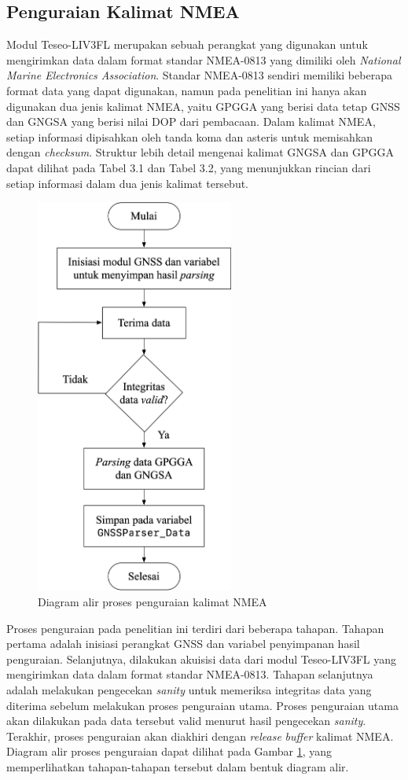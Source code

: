 \subsection{Penguraian Kalimat NMEA}
Modul Teseo\hyp{}LIV3FL merupakan sebuah perangkat yang digunakan untuk mengirimkan data dalam format standar NMEA-0813 yang dimiliki oleh \textit{National Marine Electronics Association}. Standar NMEA-0813 sendiri memiliki beberapa format data yang dapat digunakan, namun pada penelitian ini hanya akan digunakan dua jenis kalimat NMEA, yaitu GPGGA yang berisi data tetap GNSS dan GNGSA yang berisi nilai DOP dari pembacaan. Dalam kalimat NMEA, setiap informasi dipisahkan oleh tanda koma dan asteris untuk memisahkan dengan \textit{checksum}. Struktur lebih detail mengenai kalimat GNGSA dan GPGGA dapat dilihat pada Tabel 3.1 dan Tabel 3.2, yang menunjukkan rincian dari setiap informasi dalam dua jenis kalimat tersebut.

\begin{figure}[H]
	\centering
	\includegraphics[width=6.5cm]{contents/chapter-3/diagram-parser.png}
	\caption{Diagram alir proses penguraian kalimat NMEA}
	\label{Fig: flowchart-parsing}
\end{figure}

Proses penguraian pada penelitian ini terdiri dari beberapa tahapan. Tahapan pertama adalah inisiasi perangkat GNSS dan variabel penyimpanan hasil penguraian. Selanjutnya, dilakukan akuisisi data dari modul Teseo\hyp{}LIV3FL yang mengirimkan data dalam format standar NMEA-0813. Tahapan selanjutnya adalah melakukan pengecekan \textit{sanity} untuk memeriksa integritas data yang diterima sebelum melakukan proses penguraian utama. Proses penguraian utama akan dilakukan pada data tersebut valid menurut hasil pengecekan \textit{sanity}. Terakhir, proses penguraian akan diakhiri dengan \textit{release} \textit{buffer} kalimat NMEA. Diagram alir proses penguraian dapat dilihat pada Gambar \ref{Fig: flowchart-parsing}, yang memperlihatkan tahapan-tahapan tersebut dalam bentuk diagram alir.

